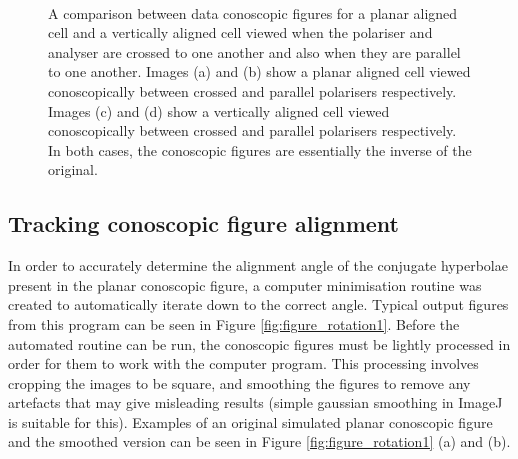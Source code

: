 \begin{figure}
\begin{center}
\\
\end{center}
\caption[Conoscopic images when polarisers are crossed and parallel]{\label{fig:pol_crossed_parallel}A comparison between data conoscopic figures for a planar aligned cell and a vertically aligned cell viewed when the polariser and analyser are crossed to one another and also when they are parallel to one another. Images (a) and (b) show a planar aligned cell viewed conoscopically between crossed and parallel polarisers respectively. Images (c) and (d) show a vertically aligned cell viewed conoscopically between crossed and parallel polarisers respectively. In both cases, the conoscopic figures are essentially the inverse of the original.}
\end{figure}

\subsection{Tracking conoscopic figure alignment}
In order to accurately determine the alignment angle of the conjugate hyperbolae present in the planar conoscopic figure, a computer minimisation routine was created to automatically iterate down to the correct angle. Typical output figures from this program can be seen in Figure \ref{fig:figure_rotation1}. Before the automated routine can be run, the conoscopic figures must be lightly processed in order for them to work with the computer program. This processing involves cropping the images to be square, and smoothing the figures to remove any artefacts that may give misleading results (simple gaussian smoothing in ImageJ is suitable for this). Examples of an original simulated planar conoscopic figure and the smoothed version can be seen in Figure \ref{fig:figure_rotation1} (a) and (b). 

